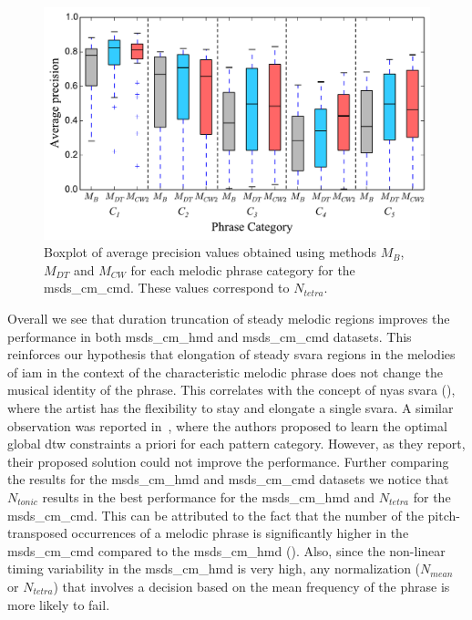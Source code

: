 \begin{figure}
	\begin{center}
		\includegraphics[width=\figSizeEightyFive]{ch06_patterns/figures/ImprovingSimilarity/CarnaticPerCategoryPerformance_BOXPLOT.pdf}
	\end{center}
	\caption{Boxplot of average precision values obtained using methods $M_{B}$, $M_{DT}$ and $M_{CW}$ for each melodic phrase category for the \acrshort{msds_cm_cmd}. These values correspond to $N_{tetra}$.}
	\label{fig:carnaticPerCategoryPerformance}
\end{figure}


Overall we see that duration truncation of steady melodic regions improves the performance in both \acrshort{msds_cm_hmd} and \acrshort{msds_cm_cmd} datasets. This reinforces our hypothesis that elongation of steady \gls{svara} regions in the melodies of \gls{iam} in the context of the characteristic melodic phrase does not change the musical identity of the phrase. This correlates with the concept of \gls{nyas} \gls{svara} (), where the artist has the flexibility to stay and elongate a single \gls{svara}. A similar observation was reported in~\cite{Rao2014}, where the authors proposed to learn the optimal global \gls{dtw} constraints a priori for each pattern category. However, as they report, their proposed solution could not improve the performance. Further comparing the results for the \acrshort{msds_cm_hmd} and \acrshort{msds_cm_cmd} datasets we notice that $N_{tonic}$ results in the best performance for the \acrshort{msds_cm_hmd} and $N_{tetra}$ for the \acrshort{msds_cm_cmd}. This can be attributed to the fact that the number of the pitch-transposed occurrences of a melodic phrase is significantly higher in the \acrshort{msds_cm_cmd} compared to the \acrshort{msds_cm_hmd} (). Also, since the non-linear timing variability in the \acrshort{msds_cm_hmd} is very high, any normalization ($N_{mean}$ or $N_{tetra}$) that involves a decision based on the mean frequency of the phrase is more likely to fail.


